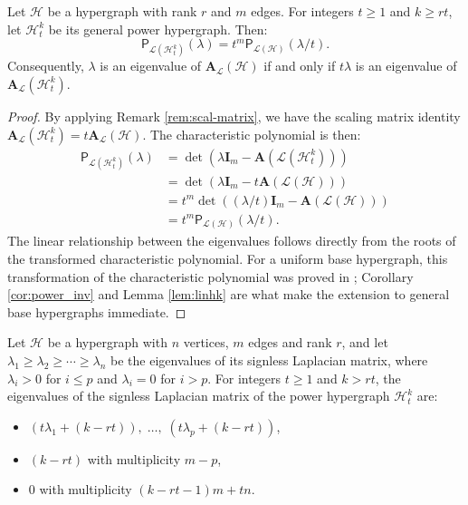 \documentclass[12pt,reqno]{amsart}
\begin{document}
\begin{proposition}\label{teo:espec-power-lin}
Let $\mathcal{H}$ be a hypergraph with rank $r$ and $m$ edges. For integers $t \geq 1$ and $k \geq rt$, let $\mathcal{H}^k_t$ be its general power hypergraph. Then:
\begin{equation*}
\mathsf{P}_{\mathcal{L}(\mathcal{H}^k_t)}(\lambda) = t^m \mathsf{P}_{\mathcal{L}(\mathcal{H})}(\lambda/t).
\end{equation*}
Consequently, $\lambda$ is an eigenvalue of $\mathbf{A}_{\mathcal{L}}(\mathcal{H})$ if and only if $t\lambda$ is an eigenvalue of $\mathbf{A}_{\mathcal{L}}(\mathcal{H}^k_t)$.
\end{proposition}
\begin{proof}
By applying Remark \ref{rem:scal-matrix}, we have the scaling matrix identity $\mathbf{A}_{\mathcal{L}}(\mathcal{H}^k_t) = t \mathbf{A}_{\mathcal{L}}(\mathcal{H})$. The characteristic polynomial is then:
\begin{align*}
\mathsf{P}_{\mathcal{L}(\mathcal{H}^k_t)}(\lambda) &= \det\left(\lambda\mathbf{I}_m - \mathbf{A}(\mathcal{L}(\mathcal{H}^k_t)) \right) \\
&= \det\left(\lambda\mathbf{I}_m - t\mathbf{A}(\mathcal{L}(\mathcal{H})) \right) \\
&= t^m \det\left((\lambda/t)\mathbf{I}_m - \mathbf{A}(\mathcal{L}(\mathcal{H})) \right) \\
&= t^m \mathsf{P}_{\mathcal{L}(\mathcal{H})}(\lambda/t).
\end{align*}
The linear relationship between the eigenvalues follows directly from the roots of the transformed characteristic polynomial. For a uniform base hypergraph, this transformation of the characteristic polynomial was proved in \cite{kaue-energia}; Corollary \ref{cor:power_inv} and Lemma \ref{lem:linhk} are what make the extension to general base hypergraphs immediate.
\end{proof}

\begin{theorem}\label{teo:power_spectrum}
Let $\mathcal{H}$ be a hypergraph with $n$ vertices, $m$ edges and rank $r$, and let $\lambda_1 \geq \lambda_2 \geq \cdots \geq \lambda_n$ be the eigenvalues of its signless Laplacian matrix, where $\lambda_i > 0$ for $i \leq p$ and $\lambda_i = 0$ for $i > p$. For integers $t \geq 1$ and $k > rt$, the eigenvalues of the signless Laplacian matrix of the power hypergraph $\mathcal{H}^k_t$ are:
\begin{itemize}
    \item[i.] $(t\lambda_1+(k-rt)),\; \ldots,\; (t\lambda_p+(k-rt))$,
    \item[ii.] $(k-rt)$ with multiplicity $m-p$,
    \item[iii.] $0$ with multiplicity $(k-rt-1)m+tn$.
\end{itemize}
\end{theorem}
\end{document}
